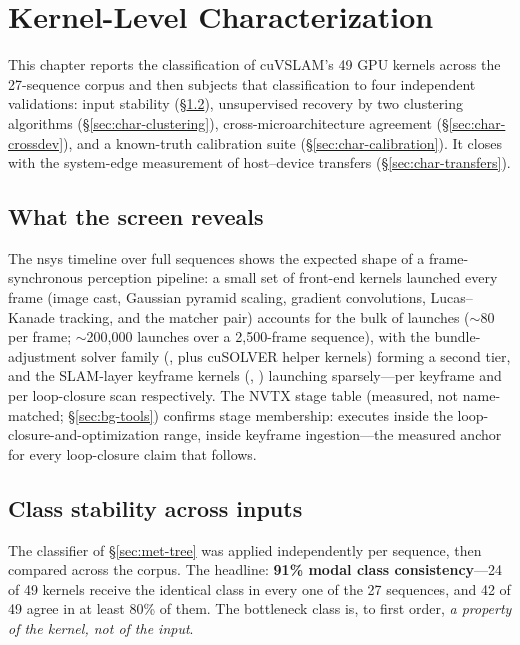 \chapter{Kernel-Level Characterization}
\label{ch:characterization}

This chapter reports the classification of cuVSLAM's 49 GPU kernels across
the 27-sequence corpus and then subjects that classification to four
independent validations: input stability (\S\ref{sec:char-stability}),
unsupervised recovery by two clustering algorithms
(\S\ref{sec:char-clustering}), cross-microarchitecture agreement
(\S\ref{sec:char-crossdev}), and a known-truth calibration suite
(\S\ref{sec:char-calibration}). It closes with the system-edge measurement
of host--device transfers (\S\ref{sec:char-transfers}).

\section{What the screen reveals}

The nsys timeline over full sequences shows the expected shape of a
frame-synchronous perception pipeline: a small set of front-end kernels
launched every frame (image cast, Gaussian pyramid scaling, gradient
convolutions, Lucas--Kanade tracking, and the matcher pair) accounts for the
bulk of launches ($\sim$80 per frame; $\sim$200{,}000 launches over a
2{,}500-frame sequence), with the bundle-adjustment solver family
(, plus cuSOLVER helper kernels) forming a second tier, and the
SLAM-layer keyframe kernels (\stBuild{}, \stTrack{}) launching sparsely---per
keyframe and per loop-closure scan respectively. The NVTX stage table
(measured, not name-matched; \S\ref{sec:bg-tools}) confirms stage
membership: \stTrack{} executes inside the loop-closure-and-optimization
range, \stBuild{} inside keyframe ingestion---the measured anchor for every
loop-closure claim that follows.

\section{Class stability across inputs}
\label{sec:char-stability}

The classifier of \S\ref{sec:met-tree} was applied independently per
sequence, then compared across the corpus. The headline: \textbf{91\% modal
class consistency}---24 of 49 kernels receive the identical class in every
one of the 27 sequences, and 42 of 49 agree in at least 80\% of them. The
bottleneck class is, to first order, \emph{a property of the kernel, not of
the input}.

